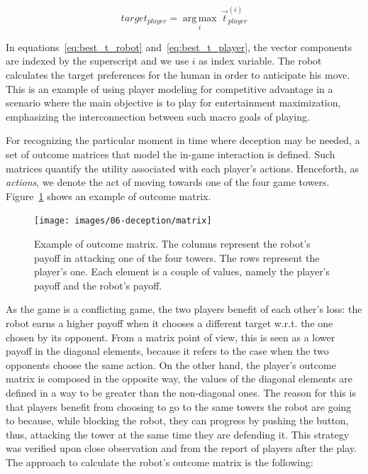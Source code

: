 \begin{equation} \label{eq:best_t_player}
target_{player} = \operatorname*{arg\,max}_i \, \overrightarrow{t}^{(i)}_{player}
\end{equation}

In equations~\ref{eq:best_t_robot} and~\ref{eq:best_t_player}, the vector components are indexed by the superscript and we use $i$ as index variable. The robot calculates the target preferences for the human in order to anticipate his move. This is an example of using player modeling for competitive advantage in a scenario where the main objective is to play for entertainment maximization, emphasizing the interconnection between such macro goals of playing.

For recognizing the particular moment in time where deception may be needed, a set of outcome matrices that model the in-game interaction is defined. Such matrices quantify the utility associated with each player's actions. Henceforth, as \textit{actions}, we denote the act of moving towards one of the four game towers. Figure~\ref{fig:matrix} shows an example of outcome matrix.

\begin{figure}[h]
    \centering
    \texttt{[image: images/06-deception/matrix]}
    \caption{Example of outcome matrix. The columns represent the  robot's payoff in attacking one of the four towers. The rows represent the player's one. Each element is a couple of values, namely the player's payoff and the robot's payoff.}
    \label{fig:matrix}
\end{figure}

As the game is a conflicting game, the two players benefit of each other's loss: the robot earns a higher payoff when it chooses a different target w.r.t. the one chosen by its opponent. From a matrix point of view, this is seen as a lower payoff in the diagonal elements, because it refers to the case when the two opponents choose the same action. On the other hand, the player's outcome matrix is composed in the opposite way, \ie the values of the diagonal elements are defined in a way to be greater than the non-diagonal ones. The reason for this is that players benefit from choosing to go to the same towers the robot are going to because, while blocking the robot, they can progress by pushing the button, thus, attacking the tower at the same time they are defending it. This strategy was verified upon close observation and from the report of players after the play. The approach to calculate the robot's outcome matrix is the following:

